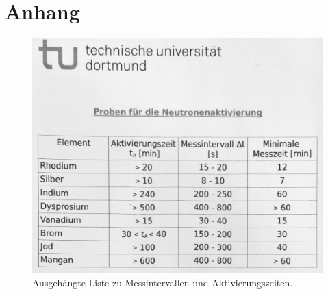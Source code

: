 \section*{Anhang}


\centering

\null\vfill
\begin{figure}
	\centering
	\includegraphics[width=0.5\paperwidth]{content/grafik/liste.jpg}
	\vspace{1ex}
	\caption{Ausgehängte Liste zu Messintervallen und Aktivierungszeiten.}
	\label{fig:liste}
\end{figure}
\vfill\null
\newpage
\null\vfill
